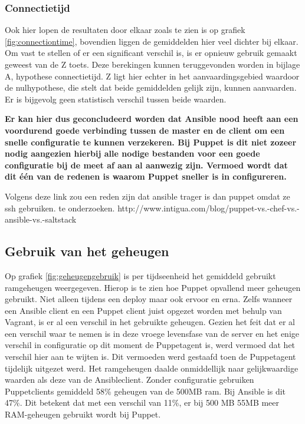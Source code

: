 \subsubsection{Connectietijd}
Ook hier lopen de resultaten door elkaar zoals te zien is op grafiek \ref{fig:connectiontime}, bovendien liggen de gemiddelden hier veel dichter bij elkaar. Om vast te stellen of er een significant verschil is, is er opnieuw gebruik gemaakt geweest van de Z toets. Deze berekingen kunnen teruggevonden worden in bijlage A, hypothese connectietijd. Z ligt hier echter in het aanvaardingsgebied waardoor de nulhypothese, die stelt dat beide gemiddelden gelijk zijn, kunnen aanvaarden. Er is bijgevolg geen statistisch verschil tussen beide waarden.

\textbf{Er kan hier dus geconcludeerd worden dat Ansible nood heeft aan een voordurend goede verbinding tussen de master en de client om een snelle configuratie te kunnen verzekeren. Bij Puppet is dit niet zozeer nodig aangezien hierbij alle nodige bestanden voor een goede configuratie bij de meet af aan al aanwezig zijn. Vermoed wordt dat dit \'e\'en van de redenen is waarom Puppet sneller is in configureren.}

 {\color{red}Volgens deze link zou een reden zijn dat ansible trager is dan puppet omdat ze ssh gebruiken. te onderzoeken. http://www.intigua.com/blog/puppet-vs.-chef-vs.-ansible-vs.-saltstack}





\subsection{Gebruik van het geheugen}

Op grafiek \ref{fig:geheugengebruik} is per tijdseenheid het gemiddeld gebruikt ramgeheugen weergegeven. Hierop is te zien hoe Puppet opvallend meer geheugen gebruikt. Niet alleen tijdens een deploy maar ook ervoor en erna. Zelfs wanneer een Ansible client en een Puppet client juist opgezet worden met behulp van Vagrant, is er al een verschil in het gebruikte geheugen. Gezien het feit dat er al een verschil waar te nemen is in deze vroege levensfase van de server en het enige verschil in configuratie op dit moment de Puppetagent is, werd vermoed dat het verschil hier aan te wijten is. Dit vermoeden werd gestaafd toen de Puppetagent tijdelijk uitgezet werd. Het ramgeheugen daalde onmiddellijk naar gelijkwaardige waarden als deze van de Ansibleclient. Zonder configuratie gebruiken Puppetclients gemiddeld 58\% geheugen van de 500MB ram. Bij Ansible is dit 47\%. Dit betekent dat met een verschil van 11\%, er bij 500 MB 55MB meer RAM-geheugen gebruikt wordt bij Puppet.


